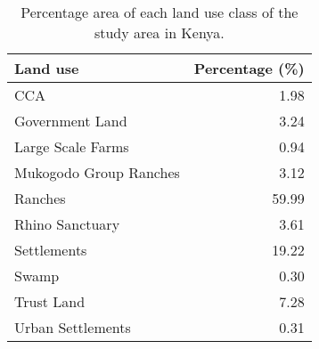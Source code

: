 \begin{table}[H]
\centering
\caption[Percentage area of each LU class, Laikipia]{Percentage area of each land use class of the study area in Kenya.} 
\label{table:lu_percentage_KEN}
\begin{tabular}{lr}
  \toprule
Land use & Percentage (\%) \\ 
  \midrule
CCA & 1.98 \\ 
  Government Land & 3.24 \\ 
  Large Scale Farms & 0.94 \\ 
  Mukogodo Group Ranches & 3.12 \\ 
  Ranches & 59.99 \\ 
  Rhino Sanctuary & 3.61 \\ 
  Settlements & 19.22 \\ 
  Swamp & 0.30 \\ 
  Trust Land & 7.28 \\ 
  Urban Settlements & 0.31 \\ 
   \bottomrule
\end{tabular}
\end{table}
